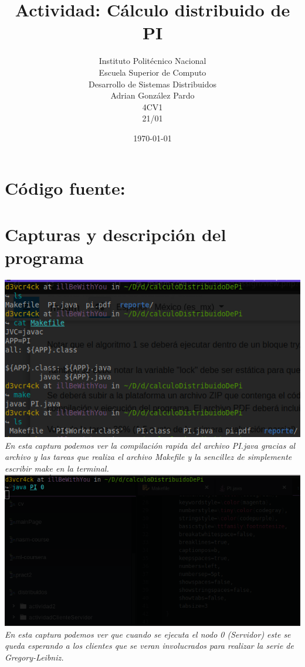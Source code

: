 \documentclass[10pt,executivepaper]{article}
\title{Actividad: Cálculo distribuido de PI}
\author{Instituto Politécnico Nacional\\Escuela Superior de Computo\\Desarrollo de Sistemas Distribuidos\\Adrian González Pardo\\4CV1\\21/01}
\date{\today}
\begin{document}
\maketitle
\section{Código fuente:}
\begin{center}
  
  
\end{center}
\section{Capturas y descripción del programa}
\begin{center}
  \includegraphics[scale=0.5]{imgs/compilacion.png}
  \\\textit{En esta captura podemos ver la compilación rapida del archivo PI.java gracias al archivo y las tareas que realiza el archivo Makefile y la sencillez de simplemente escribir make en la terminal.}
  \\
  \includegraphics[scale=0.5]{imgs/serverWait.png}
  \\\textit{En esta captura podemos ver que cuando se ejecuta el nodo 0 (Servidor) este se queda esperando a los clientes que se veran involucrados para realizar la serie de Gregory-Leibniz.}

\end{center}
\end{document}
